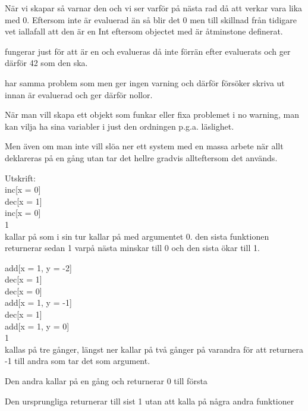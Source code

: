 När vi skapar  så varnar den och vi ser varför på nästa rad då att  verkar vara lika med 0. Eftersom  inte är evaluerad än så blir det 0 men till skillnad från tidigare vet  iallafall att den är en Int eftersom objectet med  är åtminstone definerat.

 fungerar just för att  är en  och evalueras då inte förrän efter  evaluerats och ger därför 42 som den ska.

 har samma problem som  men ger ingen varning och därför försöker skriva ut innan  är evaluerad och ger därför nollor.

\Subtask
När man vill skapa ett objekt som funkar eller fixa problemet i no warning, man kan vilja ha sina variabler i just den ordningen p.g.a. läslighet.

Men även om man inte vill slöa ner ett system med en massa arbete när allt deklareras på en gång utan tar det hellre gradvis allteftersom det används.

\Task

\Subtask
Utskrift: \\
inc[x = 0]\\
dec[x = 1]\\
inc[x = 0]\\
1\\

 kallar på  som i sin tur kallar på  med argumentet 0. den sista funktionen returnerar sedan 1 varpå nästa minskar till 0 och den sista ökar till 1.

add[x = 1, y = -2]\\
dec[x = 1]\\
dec[x = 0]\\
add[x = 1, y = -1]\\
dec[x = 1]\\
add[x = 1, y = 0]\\
1\\

 kallas på tre gånger,  längst ner kallar på  två gånger på varandra för att returnera -1 till andra  som tar det som argument.

Den andra  kallar på  en gång och returnerar 0 till första 

Den ursprungliga  returnerar till sist 1 utan att kalla på några andra funktioner

